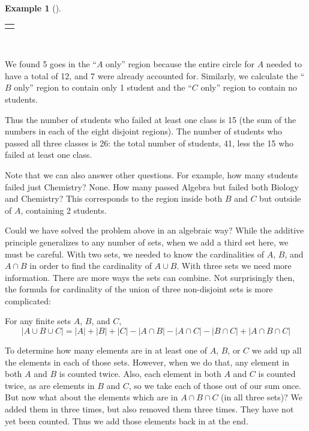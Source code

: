 \documentclass[12pt,]{book}
\theoremstyle{plain}
\theoremstyle{definition}
\theoremstyle{definition}
\newtheorem{example}[theorem]{Example}
\theoremstyle{definition}
\numberwithin{equation}{chapter}
\newlength{\panelmax}
\newcommand{\card}[1]{\left| #1 \right|}
\begin{document}
\begin{example}[]
{\begin{tabular}{@{}*{1}{c}@{}}
\begin{minipage}[c][\panelmax][t]{0.36\linewidth}\usebox{\panelboxAimage}\end{minipage}\end{tabular}\\
}%
\par
\hypertarget{p-766}{}%
We found 5 goes in the ``\(A\) only'' region because the entire circle for \(A\) needed to have a total of 12, and 7 were already accounted for. Similarly, we calculate the ``\(B\) only'' region to contain only 1 student and the ``\(C\) only'' region to contain no students.%
\par
\hypertarget{p-767}{}%
Thus the number of students who failed at least one class is 15 (the sum of the numbers in each of the eight disjoint regions). The number of students who passed all three classes is 26: the total number of students, 41, less the 15 who failed at least one class.%
\par
\hypertarget{p-768}{}%
Note that we can also answer other questions. For example, how many students failed just Chemistry? None. How many passed Algebra but failed both Biology and Chemistry? This corresponds to the region inside both \(B\) and \(C\) but outside of \(A\), containing 2 students.%
\end{example}
\hypertarget{p-769}{}%
Could we have solved the problem above in an algebraic way? While the additive principle generalizes to any number of sets, when we add a third set here, we must be careful. With two sets, we needed to know the cardinalities of \(A\), \(B\), and \(A \cap B\) in order to find the cardinality of \(A \cup B\). With three sets we need more information. There are more ways the sets can combine. Not surprisingly then, the formula for cardinality of the union of three non-disjoint sets is more complicated:%
\begin{assemblage}\label{assemblage-17}
\hypertarget{p-770}{}%
For any finite sets \(A\), \(B\), and \(C\),%
\begin{equation*}
\card{A \cup B \cup C} = \card{A} + \card{B} + \card{C} - \card{A \cap B} - \card{A \cap C} - \card{B \cap C} + \card{A \cap B \cap C}
\end{equation*}
%
\end{assemblage}
\hypertarget{p-771}{}%
To determine how many elements are in at least one of \(A\), \(B\), or \(C\) we add up all the elements in each of those sets. However, when we do that, any element in both \(A\) and \(B\) is counted twice. Also, each element in both \(A\) and \(C\) is counted twice, as are elements in \(B\) and \(C\), so we take each of those out of our sum once. But now what about the elements which are in \(A \cap B \cap C\) (in all three sets)? We added them in three times, but also removed them three times. They have not yet been counted. Thus we add those elements back in at the end.%
\end{document}

